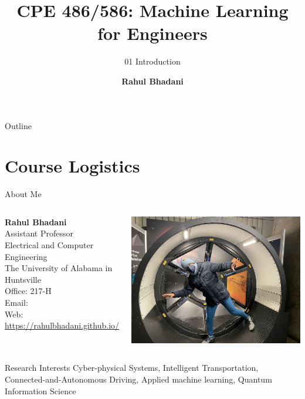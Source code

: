 \documentclass[aspectratio=169,xcolor=dvipsnames,svgnames,x11names,fleqn]{beamer}
\title[CPE 486/586: Machine Learning]{CPE 486/586: Machine Learning for Engineers} %
\subtitle{01 Introduction}
\author[Rahul Bhadani] {{\Large \textbf{Rahul Bhadani}}}
\institute[UAH] %
{
    Electrical \& Computer Engineering,  The University of Alabama in Huntsville
}
\date
\begin{document}
\begin{frame}
  \titlepage
\end{frame}

\begin{frame}{Outline}
  \backgroundtableofcontents
\end{frame}

\section{Course Logistics}

\begin{frame}{About Me}
    \begin{columns}[c] %

        \textbf{Rahul Bhadani} \\
        Assistant Professor \\
        Electrical and Computer Engineering \\
        The University of Alabama in Huntsville \\
        Office: 217-H \\
        Email: {\color{MediumRed}{rahul.bhadani@uah.edu}} \\
        Web: {\color{MediumRed}\url{https://rahulbhadani.github.io/}}

        \includegraphics[width=.89\textwidth]{figures/intro_rkb.jpg}
    \end{columns}
    
    \begin{block}{Research Interests}
    Cyber-physical Systems,
    Intelligent Transportation, 
    Connected-and-Autonomous Driving, 
    Applied machine learning,
    Quantum Information Science
    \end{block}
\end{frame}
\end{document}
